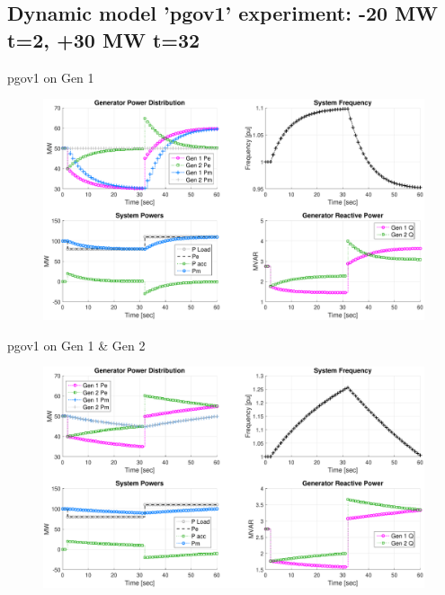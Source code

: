 \documentclass[14pt, unknownkeysallowed]{beamer}
\begin{document}
\subsection{Dynamic model 'pgov1' experiment: -20 MW t=2, +30 MW t=32}
\begin{frame}
pgov1 on Gen 1
\begin{figure}
	\includegraphics[width=\linewidth]{pgov1x1.pdf}
\end{figure}
\end{frame}
\begin{frame}
pgov1 on Gen 1 \& Gen 2
\begin{figure}
\includegraphics[width=\linewidth]{pgov1x2.pdf}
\end{figure}
\end{frame}


\end{document}
